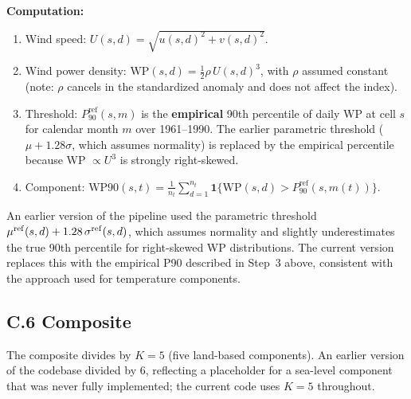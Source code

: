 \documentclass[12pt]{article}
\begin{document}
\noindent\textbf{Computation:}
\begin{enumerate}
\item Wind speed: $U(s,d) = \sqrt{u(s,d)^2 + v(s,d)^2}$.
\item Wind power density: $\mathrm{WP}(s,d) = \frac{1}{2}\rho\,U(s,d)^3$, with $\rho$ assumed constant (note: $\rho$ cancels in the standardized anomaly and does not affect the index).
\item Threshold: $P_{90}^{\mathrm{ref}}(s,m)$ is the \textbf{empirical} 90th percentile of daily WP at cell $s$ for calendar month $m$ over 1961--1990. The earlier parametric threshold ($\mu + 1.28\sigma$, which assumes normality) is replaced by the empirical percentile because WP $\propto U^3$ is strongly right-skewed.
\item Component: $\mathrm{WP90}(s,t) = \frac{1}{n_t}\sum_{d=1}^{n_t} \mathbf{1}\{\mathrm{WP}(s,d) > P_{90}^{\mathrm{ref}}(s,m(t))\}$.
\end{enumerate}
 
An earlier version of the pipeline used the parametric threshold $\mu^{\rm ref}(s,d) + 1.28\,\sigma^{\rm ref}(s,d)$, which assumes normality and slightly underestimates the true 90th percentile for right-skewed WP distributions. The current version replaces this with the empirical P90 described in Step~3 above, consistent with the approach used for temperature components.
 
\subsection*{C.6 Composite}
 
The composite divides by $K=5$ (five land-based components). An earlier version of the codebase divided by 6, reflecting a placeholder for a sea-level component that was never fully implemented; the current code uses $K=5$ throughout.
 
\end{document}
